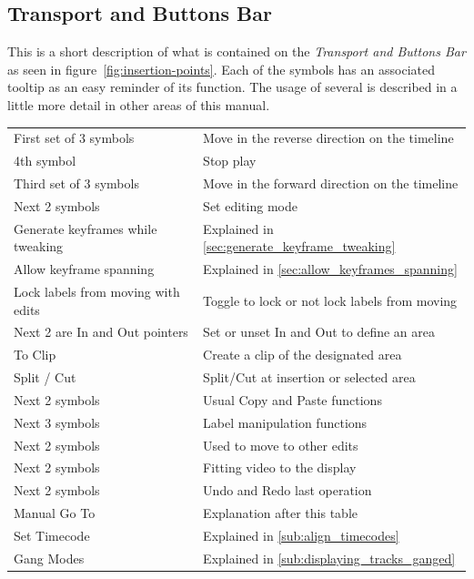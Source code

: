 \subsection{Transport and Buttons Bar}%
\label{sub:transport_buttons}

This is a short description of what is contained on the \textit{Transport and Buttons Bar} as seen in
figure~\ref{fig:insertion-points}.
Each of the symbols has an associated tooltip as an easy reminder of its function.  The usage of
several is described in a little more detail in other areas of this manual. 

\vspace{2ex}
\begin{longtable}{ll}
   \hline
	First set of 3 symbols & Move in the reverse direction on the timeline \\
        4th symbol & Stop play \\
	Third set of 3 symbols & Move in the forward direction on the timeline \\
	Next 2 symbols & Set editing mode \\
	Generate keyframes while tweaking & Explained in \ref{sec:generate_keyframe_tweaking}\\
	Allow keyframe spanning & Explained in \ref{sec:allow_keyframes_spanning}\\
	Lock labels from moving with edits & Toggle to lock or not lock labels from moving \\
	Next 2 are In and Out pointers & Set or unset In and Out to define an area \\
	To Clip & Create a clip of the designated area \\
	Split / Cut & Split/Cut at insertion or selected area \\
	Next 2 symbols & Usual Copy and Paste functions \\
	Next 3 symbols & Label manipulation functions  \\
	Next 2 symbols & Used to move to other edits  \\
	Next 2 symbols & Fitting video to the display  \\
	Next 2 symbols & Undo and Redo last operation  \\
	Manual Go To & Explanation after this table  \\
	Set Timecode & Explained in \ref{sub:align_timecodes}  \\
	Gang Modes & Explained in \ref{sub:displaying_tracks_ganged} \\
   \hline
\end{longtable}

